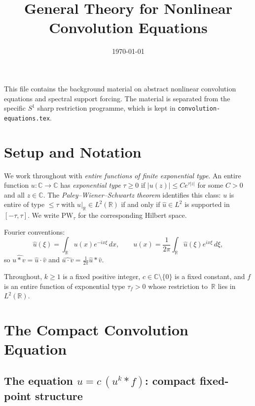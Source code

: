 \documentclass[12pt]{article}
\title{\textbf{General Theory for Nonlinear Convolution Equations}}
\author{}
\date{\today}
\theoremstyle{definition}
\theoremstyle{remark}
\newcommand{\R}{\mathbb{R}}
\newcommand{\C}{\mathbb{C}}
\newcommand{\PW}{\mathrm{PW}}
\newcommand{\wh}{\widehat}
\newcommand{\abs}[1]{\left|#1\right|}
\begin{document}
\maketitle
\tableofcontents
\bigskip

This file contains the background material on abstract nonlinear convolution
equations and spectral support forcing.  The material is separated from the
specific $S^1$ sharp restriction programme, which is kept in
\texttt{convolution-equations.tex}.



\section{Setup and Notation}
\label{sec:setup}

We work throughout with \emph{entire functions of finite exponential type}.
An entire function $u:\C\to\C$ has \emph{exponential type} $\tau\geq 0$ if
$\abs{u(z)}\leq Ce^{\tau\abs{z}}$ for some $C>0$ and all $z\in\C$.
The \emph{Paley--Wiener--Schwartz theorem} identifies this class:
$u$ is entire of type $\leq\tau$ with $u|_{\R}\in L^2(\R)$ if and only if
$\wh u\in L^2$ is supported in $[-\tau,\tau]$.
We write $\PW_\tau$ for the corresponding Hilbert space.

Fourier conventions:
\[
  \wh u(\xi)=\int_\R u(x)e^{-ix\xi}\,dx,
  \qquad
  u(x)=\frac{1}{2\pi}\int_\R \wh u(\xi)e^{ix\xi}\,d\xi,
\]
so $\widehat{u\ast v}=\wh u\cdot\wh v$ and
$\widehat{u\cdot v}=\tfrac{1}{2\pi}\wh u\ast\wh v$.

Throughout, $k\geq 1$ is a fixed positive integer, $c\in\C\setminus\{0\}$
is a fixed constant, and $f$ is an entire function of exponential type
$\tau_f>0$ whose restriction to~$\R$ lies in $L^2(\R)$.

\section{The Compact Convolution Equation}
\label{sec:two-eqns}

\subsection{The equation $u=c\,(u^k\ast f)$: compact fixed-point structure}
\label{sec:reversed-eqn}
\end{document}
